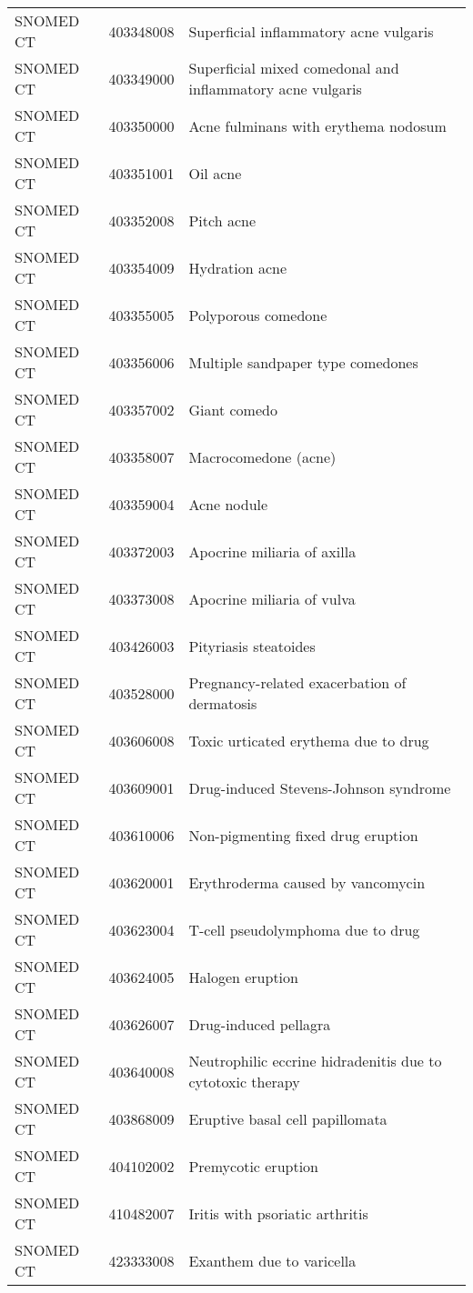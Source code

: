 \begin{longtable}{p{}p{}p{}}
  SNOMED CT & 403348008 & Superficial inflammatory acne vulgaris \\ 
  SNOMED CT & 403349000 & Superficial mixed comedonal and inflammatory acne vulgaris \\ 
  SNOMED CT & 403350000 & Acne fulminans with erythema nodosum \\ 
  SNOMED CT & 403351001 & Oil acne \\ 
  SNOMED CT & 403352008 & Pitch acne \\ 
  SNOMED CT & 403354009 & Hydration acne \\ 
  SNOMED CT & 403355005 & Polyporous comedone \\ 
  SNOMED CT & 403356006 & Multiple sandpaper type comedones \\ 
  SNOMED CT & 403357002 & Giant comedo \\ 
  SNOMED CT & 403358007 & Macrocomedone (acne) \\ 
  SNOMED CT & 403359004 & Acne nodule \\ 
  SNOMED CT & 403372003 & Apocrine miliaria of axilla \\ 
  SNOMED CT & 403373008 & Apocrine miliaria of vulva \\ 
  SNOMED CT & 403426003 & Pityriasis steatoides \\ 
  SNOMED CT & 403528000 & Pregnancy-related exacerbation of dermatosis \\ 
  SNOMED CT & 403606008 & Toxic urticated erythema due to drug \\ 
  SNOMED CT & 403609001 & Drug-induced Stevens-Johnson syndrome \\ 
  SNOMED CT & 403610006 & Non-pigmenting fixed drug eruption \\ 
  SNOMED CT & 403620001 & Erythroderma caused by vancomycin \\ 
  SNOMED CT & 403623004 & T-cell pseudolymphoma due to drug \\ 
  SNOMED CT & 403624005 & Halogen eruption \\ 
  SNOMED CT & 403626007 & Drug-induced pellagra \\ 
  SNOMED CT & 403640008 & Neutrophilic eccrine hidradenitis due to cytotoxic therapy \\ 
  SNOMED CT & 403868009 & Eruptive basal cell papillomata \\ 
  SNOMED CT & 404102002 & Premycotic eruption \\ 
  SNOMED CT & 410482007 & Iritis with psoriatic arthritis \\ 
  SNOMED CT & 423333008 & Exanthem due to varicella \\ 

\end{longtable}
